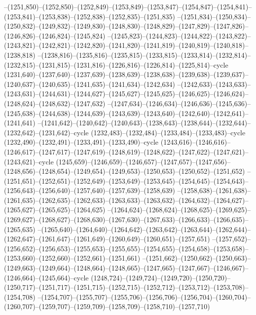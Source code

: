 --(1251,850)--(1252,850)--(1252,849)--(1253,849)--(1253,847)--(1254,847)--(1254,841)--(1253,841)--(1253,838)--(1252,838)--(1252,835)--(1251,835)
--(1251,834)--(1250,834)--(1250,832)--(1249,832)--(1249,830)--(1248,830)--(1248,829)--(1247,829)--(1247,826)--(1246,826)--(1246,824)--(1245,824)
--(1245,823)--(1244,823)--(1244,822)--(1243,822)--(1243,821)--(1242,821)--(1242,820)--(1241,820)--(1241,819)--(1240,819)--(1240,818)--(1238,818)
--(1238,816)--(1235,816)--(1235,815)--(1233,815)--(1233,814)--(1232,814)--(1232,815)--(1231,815)--(1231,816)--(1226,816)--(1226,814)--(1225,814)--cycle
(1231,640)--(1237,640)--(1237,639)--(1238,639)--(1238,638)--(1239,638)--(1239,637)--(1240,637)--(1240,635)--(1241,635)--(1241,634)--(1242,634)
--(1242,633)--(1243,633)--(1243,631)--(1244,631)--(1244,627)--(1245,627)--(1245,625)--(1246,625)--(1246,624)--(1248,624)--(1248,632)--(1247,632)
--(1247,634)--(1246,634)--(1246,636)--(1245,636)--(1245,638)--(1244,638)--(1244,639)--(1243,639)--(1243,640)--(1242,640)--(1242,641)--(1241,641)
--(1241,642)--(1240,642)--(1240,643)--(1238,643)--(1238,644)--(1232,644)--(1232,642)--(1231,642)--cycle
(1232,483)--(1232,484)--(1233,484)--(1233,483)--cycle
(1232,490)--(1232,491)--(1233,491)--(1233,490)--cycle
(1243,616)--(1246,616)--(1246,617)--(1247,617)--(1247,619)--(1248,619)--(1248,622)--(1247,622)--(1247,621)--(1243,621)--cycle
(1245,659)--(1246,659)--(1246,657)--(1247,657)--(1247,656)--(1248,656)--(1248,654)--(1249,654)--(1249,653)--(1250,653)--(1250,652)--(1251,652)
--(1251,651)--(1252,651)--(1252,649)--(1253,649)--(1253,645)--(1254,645)--(1254,643)--(1256,643)--(1256,640)--(1257,640)--(1257,639)--(1258,639)
--(1258,638)--(1261,638)--(1261,635)--(1262,635)--(1262,633)--(1263,633)--(1263,632)--(1264,632)--(1264,627)--(1265,627)--(1265,625)--(1264,625)
--(1264,624)--(1268,624)--(1268,625)--(1269,625)--(1269,627)--(1268,627)--(1268,630)--(1267,630)--(1267,633)--(1266,633)--(1266,635)--(1265,635)
--(1265,640)--(1264,640)--(1264,642)--(1263,642)--(1263,644)--(1262,644)--(1262,647)--(1261,647)--(1261,649)--(1260,649)--(1260,651)--(1257,651)
--(1257,652)--(1256,652)--(1256,653)--(1255,653)--(1255,655)--(1254,655)--(1254,658)--(1253,658)--(1253,660)--(1252,660)--(1252,661)--(1251,661)
--(1251,662)--(1250,662)--(1250,663)--(1249,663)--(1249,664)--(1248,664)--(1248,665)--(1247,665)--(1247,667)--(1246,667)--(1246,664)--(1245,664)--cycle
(1248,724)--(1249,724)--(1249,720)--(1250,720)--(1250,717)--(1251,717)--(1251,715)--(1252,715)--(1252,712)--(1253,712)--(1253,708)--(1254,708)
--(1254,707)--(1255,707)--(1255,706)--(1256,706)--(1256,704)--(1260,704)--(1260,707)--(1259,707)--(1259,709)--(1258,709)--(1258,710)--(1257,710)
